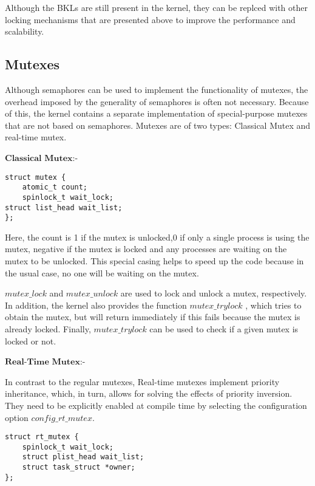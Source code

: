 \documentclass[a4paper]{article}
\begin{document}
Although the BKLs are still present in the kernel, they can be replced with other locking mechanisms that are presented above to improve the performance and scalability.

\newpage

\subsection{Mutexes}

Although semaphores can be used to implement the functionality of mutexes, the overhead imposed
by the generality of semaphores is often not necessary. Because of this, the kernel contains a separate
implementation of special-purpose mutexes that are not based on semaphores.
\newline
Mutexes are of two types: Classical Mutex and real-time mutex.	
\newline


$\textbf{Classical Mutex}$:-
\begin{verbatim}
struct mutex {
	atomic_t count;
	spinlock_t wait_lock;
struct list_head wait_list;
};
\end{verbatim}

Here, the count is 1 if the mutex is unlocked,0 if only a single process is using the mutex, negative if the mutex is locked and any processes are waiting on the mutex to be unlocked. This special casing helps to speed up the code because in the usual case, no one will be waiting on the mutex.

$mutex\_lock$ and $mutex\_unlock$ are used to lock and unlock a mutex, respectively. In addition, the kernel
also provides the function $mutex\_trylock$ , which tries to obtain the mutex, but will return immediately
if this fails because the mutex is already locked. Finally, $mutex\_trylock$ can be used to check if a given
mutex is locked or not.
\newline


$\textbf{Real-Time Mutex}$:-

In contrast to the regular mutexes, Real-time mutexes implement priority inheritance, which, in turn, allows for solving the effects of priority inversion. They need to be explicitly enabled at compile time by selecting the configuration option $config\_rt\_mutex$.

\begin{verbatim}
struct rt_mutex {
	spinlock_t wait_lock;
	struct plist_head wait_list;
	struct task_struct *owner;
};
\end{verbatim}
\end{document}
